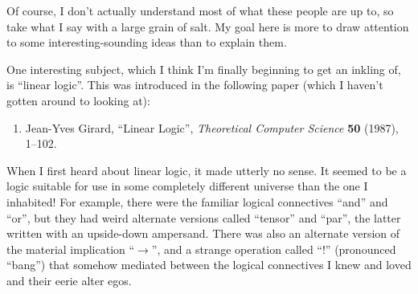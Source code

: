 \documentclass[12pt]{article}
\def\tightlist{}
\begin{document}
Of course, I don't actually understand most of what these people are up
to, so take what I say with a large grain of salt. My goal here is more
to draw attention to some interesting-sounding ideas than to explain
them.

One interesting subject, which I think I'm finally beginning to get an
inkling of, is ``linear logic''. This was introduced in the following
paper (which I haven't gotten around to looking at):

\begin{enumerate}
\def\labelenumi{\arabic{enumi})}
\tightlist
\item
  Jean-Yves Girard,  ``Linear Logic'', \emph{Theoretical Computer
  Science} \textbf{50} (1987), 1--102.
\end{enumerate}

When I first heard about linear logic, it made utterly no sense. It
seemed to be a logic suitable for use in some completely different
universe than the one I inhabited! For example, there were the familiar
logical connectives ``and'' and ``or'', but they had weird alternate
versions called ``tensor'' and ``par'', the latter written with an
upside-down ampersand. There was also an alternate version of the
material implication ``\(\to\)'', and a strange operation called
``\(!\)'' (pronounced ``bang'') that somehow mediated between the
logical connectives I knew and loved and their eerie alter egos.
\end{document}
